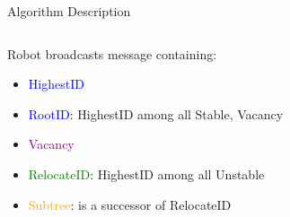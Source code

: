\begin{frame}{Algorithm Description}
  \begin{columns}[T] %
    \begin{column}{.5\textwidth}
      \small{
        Robot broadcasts message containing:
        \begin{itemize}
        \item \textcolor{blue}{HighestID} 
        \item \textcolor{blue}{RootID}: HighestID among all Stable, Vacancy
        \item \textcolor{purple}{Vacancy}
        \item \textcolor{green}{RelocateID}: HighestID among all Unstable 
        \item \textcolor{orange}{Subtree}: is a successor of RelocateID
        \end{itemize}
      }
    \end{column}%
    \begin{column}{.4\textwidth}
      
    \end{column}%
  \end{columns}
\end{frame}